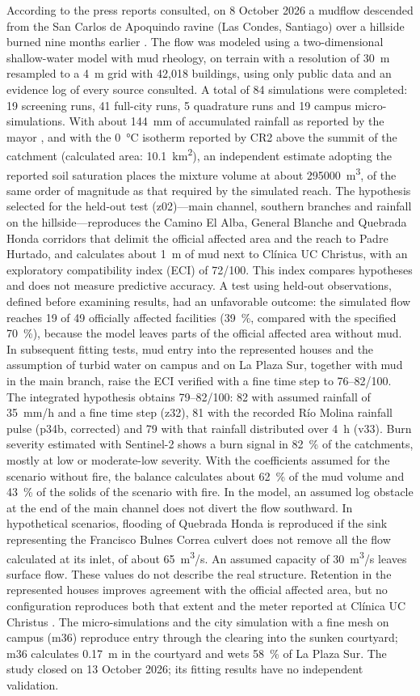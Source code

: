 According to the press reports consulted, on 8 October 2026 a mudflow descended from the San Carlos de Apoquindo ravine (Las Condes, Santiago) over a hillside burned nine months earlier \citep{biobio2026origen}. The flow was modeled using a two-dimensional shallow-water model with mud rheology, on terrain with a resolution of \SI{30}{m} resampled to a \SI{4}{m} grid with 42,018 buildings, using only public data and an evidence log of every source consulted. A total of 84 simulations were completed: 19 screening runs, 41 full-city runs, 5 quadrature runs and 19 campus micro-simulations. With about \SI{144}{mm} of accumulated rainfall as reported by the mayor \citep{interferencia2026}, and with the \SI{0}{\celsius} isotherm reported by CR2 above the summit of the catchment \citep{cr2_2026} (calculated area: \SI{10.1}{km^2}), an independent estimate adopting the reported soil saturation places the mixture volume at about \SI{295000}{m^3}, of the same order of magnitude as that required by the simulated reach. The hypothesis selected for the held-out test (z02)---main channel, southern branches and rainfall on the hillside---reproduces the Camino El Alba, General Blanche and Quebrada Honda corridors that delimit the official affected area and the reach to Padre Hurtado, and calculates about \SI{1}{m} of mud next to Clínica UC Christus, with an exploratory compatibility index (ECI) of 72/100. This index compares hypotheses and does not measure predictive accuracy. A test using held-out observations, defined before examining results, had an unfavorable outcome: the simulated flow reaches 19 of 49 officially affected facilities (\SI{39}{\percent}, compared with the specified \SI{70}{\percent}), because the model leaves parts of the official affected area without mud. In subsequent fitting tests, mud entry into the represented houses and the assumption of turbid water on campus and on La Plaza Sur, together with mud in the main branch, raise the ECI verified with a fine time step to 76--82/100. The integrated hypothesis obtains 79--82/100: 82 with assumed rainfall of \SI{35}{mm/h} and a fine time step (z32), 81 with the recorded Río Molina rainfall pulse (p34b, corrected) and 79 with that rainfall distributed over \SI{4}{h} (v33). Burn severity estimated with Sentinel-2 shows a burn signal in \SI{82}{\percent} of the catchments, mostly at low or moderate-low severity. With the coefficients assumed for the scenario without fire, the balance calculates about \SI{62}{\percent} of the mud volume and \SI{43}{\percent} of the solids of the scenario with fire. In the model, an assumed log obstacle at the end of the main channel does not divert the flow southward. In hypothetical scenarios, flooding of Quebrada Honda is reproduced if the sink representing the Francisco Bulnes Correa culvert does not remove all the flow calculated at its inlet, of about \SI{65}{m^3/s}. An assumed capacity of \SI{30}{m^3/s} leaves surface flow. These values do not describe the real structure. Retention in the represented houses improves agreement with the official affected area, but no configuration reproduces both that extent and the meter reported at Clínica UC Christus \citep{cadena3_2026}. The micro-simulations and the city simulation with a fine mesh on campus (m36) reproduce entry through the clearing into the sunken courtyard; m36 calculates \SI{0.17}{m} in the courtyard and wets \SI{58}{\percent} of La Plaza Sur. The study closed on 13 October 2026; its fitting results have no independent validation.
